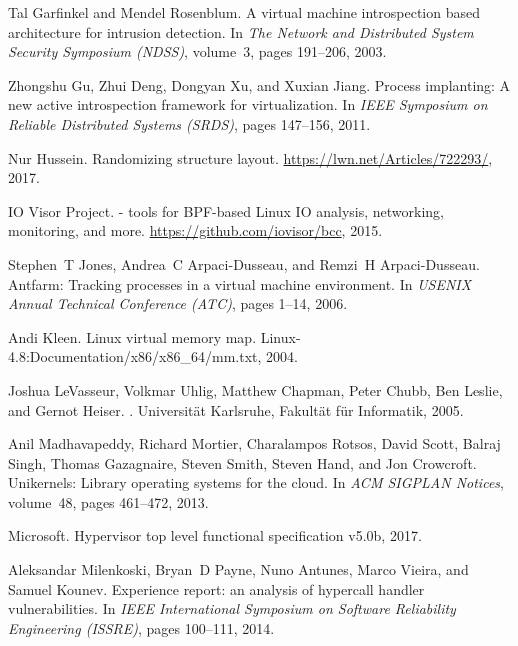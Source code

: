 \documentclass[11pt]{article}
\begin{document}
\begin{thebibliography}{10}
\begin{small}
  Tal Garfinkel and Mendel Rosenblum.
  \newblock A virtual machine introspection based architecture for intrusion
    detection.
  \newblock In {\em The Network and Distributed System Security Symposium
    (NDSS)}, volume~3, pages 191--206, 2003.
  
  Zhongshu Gu, Zhui Deng, Dongyan Xu, and Xuxian Jiang.
  \newblock Process implanting: A new active introspection framework for
    virtualization.
  \newblock In {\em IEEE Symposium on Reliable Distributed Systems (SRDS)}, pages
    147--156, 2011.
  
  Nur Hussein.
  \newblock Randomizing structure layout.
  \newblock \url{https://lwn.net/Articles/722293/}, 2017.
  
  {IO Visor Project}.
   - tools for {BPF}-based {Linux} {IO} analysis, networking,
    monitoring, and more.
  \newblock \url{https://github.com/iovisor/bcc}, 2015.
  
  Stephen~T Jones, Andrea~C Arpaci-Dusseau, and Remzi~H Arpaci-Dusseau.
  \newblock Antfarm: Tracking processes in a virtual machine environment.
  \newblock In {\em USENIX Annual Technical Conference (ATC)}, pages 1--14, 2006.
  
  Andi Kleen.
  \newblock Linux virtual memory map.
  \newblock Linux-4.8:Documentation/x86/x86\_64/mm.txt, 2004.
  
  Joshua LeVasseur, Volkmar Uhlig, Matthew Chapman, Peter Chubb, Ben Leslie, and
    Gernot Heiser.
  .
  \newblock Universit{\"a}t Karlsruhe, Fakult{\"a}t f{\"u}r Informatik, 2005.
  
  Anil Madhavapeddy, Richard Mortier, Charalampos Rotsos, David Scott, Balraj
    Singh, Thomas Gazagnaire, Steven Smith, Steven Hand, and Jon Crowcroft.
  \newblock Unikernels: Library operating systems for the cloud.
  \newblock In {\em ACM SIGPLAN Notices}, volume~48, pages 461--472, 2013.
  
  Microsoft.
  \newblock Hypervisor top level functional specification v5.0b, 2017.
  
  Aleksandar Milenkoski, Bryan~D Payne, Nuno Antunes, Marco Vieira, and Samuel
    Kounev.
  \newblock Experience report: an analysis of hypercall handler vulnerabilities.
  \newblock In {\em {IEEE International Symposium on Software Reliability
    Engineering (ISSRE)}}, pages 100--111, 2014.
  

\end{small}
\end{thebibliography}
\end{document}
